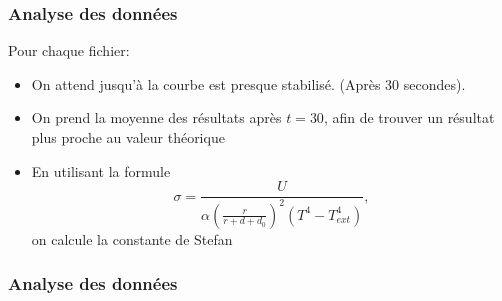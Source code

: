 \documentclass{beamer}
\begin{document}
\begin{frame}
\frametitle{Analyse des données}
Pour chaque fichier:
\begin{itemize}
	\item{On attend jusqu'à la courbe est presque stabilisé. (Après 30 secondes).}
	\item{On prend la moyenne des résultats après $t=30$, afin de trouver un résultat plus proche au valeur théorique}
	\item{En utilisant la formule $$\sigma = \frac{U}{\alpha\left(\frac{r}{r+d+d_0}\right)^2 (T^4-T_{ext}^4)},$$ on calcule la constante de Stefan}

\end{itemize}
\end{frame}





\begin{frame}
\frametitle{Analyse des données}
\begin{table}[htdp]
\begin{center}
 \caption{Erreur absolue (erreur relative)}
\end{center}
\label{defaulttable}
\end{table}

\end{frame}
\end{document}
